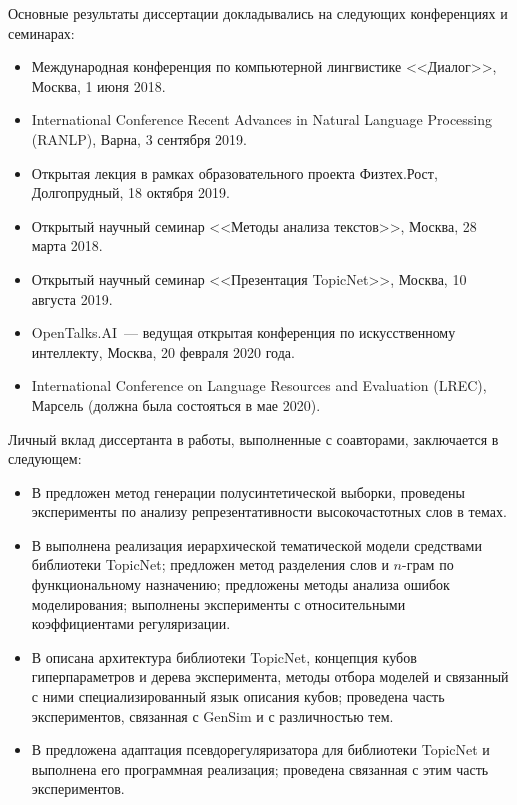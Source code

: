 {\probation} 
Основные результаты диссертации докладывались на следующих конференциях и семинарах: 
\begin{itemize} 
    \item Международная конференция по компьютерной лингвистике <<Диалог>>, Москва, 1 июня 2018. 
    \item International Conference Recent Advances in Natural Language Processing (RANLP), Варна, 3 сентября 2019. 
    \item Открытая лекция в рамках образовательного проекта Физтех.Рост, Долгопрудный, 18 октября 2019. 
    \item Открытый научный семинар <<Методы анализа текстов>>, Москва, 28 марта 2018. 
    \item Открытый научный семинар <<Презентация TopicNet>>, Москва, 10 августа 2019. 
    \item OpenTalks.AI~--- ведущая открытая конференция по искусственному интеллекту, Москва, 20 февраля 2020 года. 
    \item International Conference on Language Resources and Evaluation (LREC), Марсель (должна была состояться в мае 2020). 
\end{itemize} 

{\contribution} Личный вклад диссертанта в работы, выполненные с 
соавторами, заключается в следующем: 
\begin{itemize} 
    \item В \cite{intracoh} предложен метод генерации полусинтетической выборки, проведены эксперименты по анализу репрезентативности высокочастотных слов в темах. 
    \item В \cite{popov_hier} выполнена реализация иерархической тематической модели средствами библиотеки TopicNet; предложен метод разделения слов и $n$-грам по функциональному назначению; предложены методы анализа ошибок моделирования; выполнены эксперименты с относительными коэффициентами регуляризации. 
    \item В \cite{bulatov2020topicnet} описана архитектура библиотеки TopicNet, концепция кубов гиперпараметров и дерева эксперимента, методы отбора моделей и связанный с ними специализированный язык описания кубов; проведена часть экспериментов, связанная с GenSim и с различностью тем. 
    \item В \cite{thetaless} предложена адаптация псевдорегуляризатора для библиотеки TopicNet и выполнена его программная реализация; проведена связанная с этим часть экспериментов. 
\end{itemize} 

